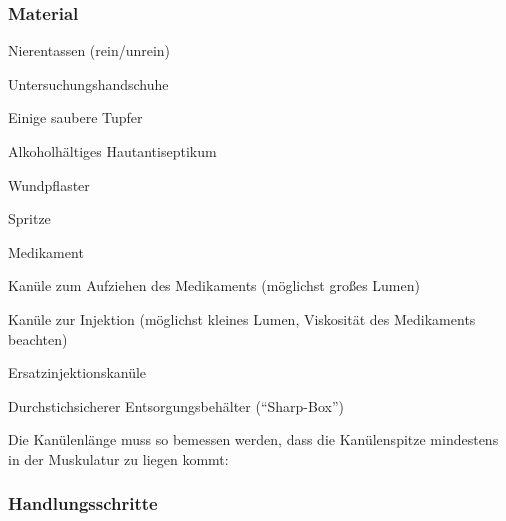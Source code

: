\subsubsection{Material}

\begin{FamPropMaterial}
\begin{compactenum}
  \item Nierentassen (rein/unrein)
  \item Untersuchungshandschuhe
  \item Einige saubere Tupfer
  \item Alkoholhältiges
  Hautantiseptikum
  \item Wundpflaster
  \item Spritze
  \item Medikament
  \item Kanüle zum
  Aufziehen des Medikaments (möglichst großes Lumen)
  \item Kanüle zur Injektion (möglichst kleines
  Lumen, Viskosität des Medikaments beachten)
  \item Ersatzinjektionskanüle
  \item Durchstichsicherer
  Entsorgungsbehälter (\enquote{Sharp-Box})
\end{compactenum}
\end{FamPropMaterial}




Die Kanülenlänge muss so bemessen werden, dass die
Kanülenspitze mindestens  in der Muskulatur zu liegen kommt:



\subsubsection{Handlungsschritte}

